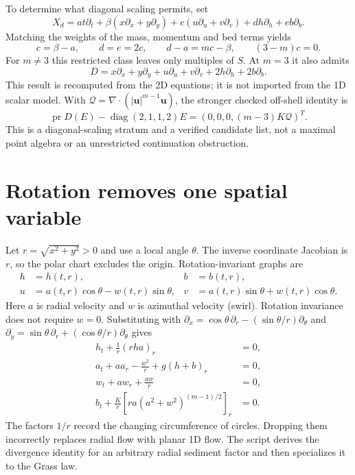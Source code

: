 \documentclass[11pt]{article}
\newcommand{\U}{\mathbf u}
\newcommand{\pr}{\operatorname{pr}}
\begin{document}
To determine what diagonal scaling permits, set
\[
 X_d=a t\partial_t+\beta(x\partial_x+y\partial_y)
       +c(u\partial_u+v\partial_v)+d h\partial_h+e b\partial_b.
\]
Matching the weights of the mass, momentum and bed terms yields
\begin{equation}\label{eq:weights}
 c=\beta-a,\qquad d=e=2c,\qquad d-a=mc-\beta,
 \qquad\boxed{(3-m)c=0.}
\end{equation}
For $m\ne3$ this restricted class leaves only multiples of $S$.
At $m=3$ it also admits
\begin{equation}\label{eq:D}
 D=x\partial_x+y\partial_y+u\partial_u+v\partial_v
                         +2h\partial_h+2b\partial_b.
\end{equation}
This result is recomputed from the 2D equations; it is not imported from
the 1D scalar model. With $\mathcal Q=\nabla\cdot(|\U|^{m-1}\U)$,
the stronger checked off-shell identity is
\begin{equation}\label{eq:defect}
 \pr D(E)-\operatorname{diag}(2,1,1,2)E
            =(0,0,0,(m-3)K\mathcal Q)^T.
\end{equation}
This is a diagonal-scaling stratum and a verified candidate list, not a
maximal point algebra or an unrestricted continuation obstruction.

\section{Rotation removes one spatial variable}
Let $r=\sqrt{x^2+y^2}>0$ and use a local angle $\theta$.
The inverse coordinate Jacobian is $r$, so the polar chart excludes the
origin. Rotation-invariant graphs are
\begin{equation}\label{eq:radial-ansatz}
\begin{aligned}
 h&=h(t,r),& b&=b(t,r),\\
 u&=a(t,r)\cos\theta-w(t,r)\sin\theta,&
 v&=a(t,r)\sin\theta+w(t,r)\cos\theta.
\end{aligned}
\end{equation}
Here $a$ is radial velocity and $w$ is azimuthal velocity (swirl).
Rotation invariance does not require $w=0$.
Substituting with
$\partial_x=\cos\theta\,\partial_r-(\sin\theta/r)\partial_\theta$
and $\partial_y=\sin\theta\,\partial_r+(\cos\theta/r)\partial_\theta$
gives
\begin{equation}\label{eq:radial}
\boxed{\begin{aligned}
 h_t+\frac1r(rha)_r&=0,\\
 a_t+aa_r-\frac{w^2}{r}+g(h+b)_r&=0,\\
 w_t+aw_r+\frac{aw}{r}&=0,\\
 b_t+\frac K r\left[r a(a^2+w^2)^{(m-1)/2}\right]_r&=0.
\end{aligned}}
\end{equation}
The factors $1/r$ record the changing circumference of circles.
Dropping them incorrectly replaces radial flow with planar 1D flow.
The script derives the divergence identity for an arbitrary radial
sediment factor and then specializes it to the Grass law.
\end{document}
